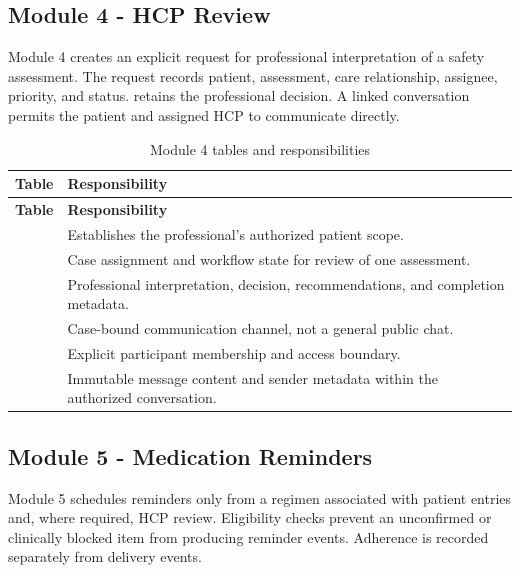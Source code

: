 \subsection{Module 4 - HCP Review}

Module 4 creates an explicit request for professional interpretation of a safety assessment. The request records patient, assessment, care relationship, assignee, priority, and status.  retains the professional decision. A linked conversation permits the patient and assigned HCP to communicate directly.


\begin{longtable}{L{4.5cm}L{10.8cm}}
\caption{Module 4 tables and responsibilities}\label{tab:module4-tables}\\
\toprule
\textbf{Table} & \textbf{Responsibility}\\
\midrule
\endfirsthead
\toprule
\textbf{Table} & \textbf{Responsibility}\\
\midrule
\endhead
{} & Establishes the professional's authorized patient scope.\\
 & Case assignment and workflow state for review of one assessment.\\
 & Professional interpretation, decision, recommendations, and completion metadata.\\
 & Case-bound communication channel, not a general public chat.\\
 & Explicit participant membership and access boundary.\\
 & Immutable message content and sender metadata within the authorized conversation.\\
\bottomrule
\end{longtable}

\subsection{Module 5 - Medication Reminders}

Module 5 schedules reminders only from a regimen associated with patient entries and, where required, HCP review. Eligibility checks prevent an unconfirmed or clinically blocked item from producing reminder events. Adherence is recorded separately from delivery events.


